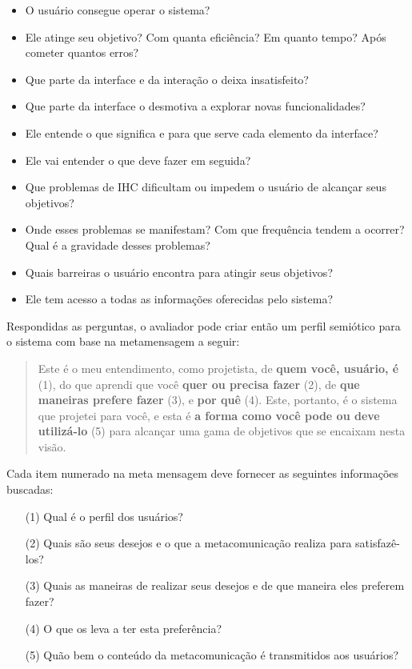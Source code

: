 \begin{itemize}
\item O usuário consegue operar o sistema?
\item Ele atinge seu objetivo? Com quanta eficiência? Em quanto tempo? Após cometer quantos erros?
\item Que parte da interface e da interação o deixa insatisfeito?
\item Que parte da interface o desmotiva a explorar novas funcionalidades?
\item Ele entende o que significa e para que serve cada elemento da interface?
\item Ele vai entender o que deve fazer em seguida?
\item Que problemas de IHC dificultam ou impedem o usuário de alcançar seus objetivos?
\item Onde esses problemas se manifestam? Com que frequência tendem a ocorrer? Qual é a gravidade desses problemas?
\item Quais barreiras o usuário encontra para atingir seus objetivos?
\item Ele tem acesso a todas as informações oferecidas pelo sistema?
\end{itemize} 

\indent Respondidas as perguntas, o avaliador pode criar então um perfil semiótico para o sistema com base na metamensagem a seguir:

\begin{quote}
Este é o meu entendimento, como projetista, de \textbf{quem você, usuário, é} (1), do que aprendi que você \textbf{quer ou precisa fazer} (2), de \textbf{que maneiras prefere fazer} (3), e \textbf{por quê} (4). Este, portanto, é o sistema que projetei para você, e esta é \textbf{a forma como você pode ou deve utilizá-lo} (5) para alcançar uma gama de objetivos que se encaixam nesta visão.
\end{quote}

\indent Cada item numerado na meta mensagem deve fornecer as seguintes informações buscadas:

\begin{itemize}
\item[(1)] Qual é o perfil dos usuários?
\item[(2)] Quais são seus desejos e o que a metacomunicação realiza para satisfazê-los?
\item[(3)] Quais as maneiras de realizar seus desejos e de que maneira eles preferem fazer?
\item[(4)] O que os leva a ter esta preferência?
\item[(5)] Quão bem o conteúdo da metacomunicação é transmitidos aos usuários?
\end{itemize}


